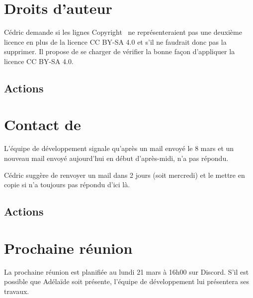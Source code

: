 \documentclass{article}
\begin{document}
\section{Droits d'auteur}

Cédric demande si les lignes \og Copyright \fg\ ne représenteraient pas une deuxième licence en plus de la licence CC BY-SA 4.0 et s'il ne faudrait donc pas la supprimer. Il propose de se charger de vérifier la bonne façon d'appliquer la licence CC BY-SA 4.0.

\subsection{Actions}

\begin{actionlist}
\end{actionlist}


\section{Contact de }

L'équipe de développement signale qu'après un mail envoyé le 8 mars et un nouveau mail envoyé aujourd'hui en début d'après-midi,  n'a pas répondu.

Cédric suggère de renvoyer un mail dans 2 jours (soit mercredi) et le mettre en copie si  n'a toujours pas répondu d'ici là.

\subsection{Actions}

\begin{actionlist}
\end{actionlist}


\section{Prochaine réunion}

La prochaine réunion est planifiée au lundi 21 mars à 16h00 sur Discord. S'il est possible que Adélaïde  soit présente, l'équipe de développement lui présentera ses travaux.
\end{document}
